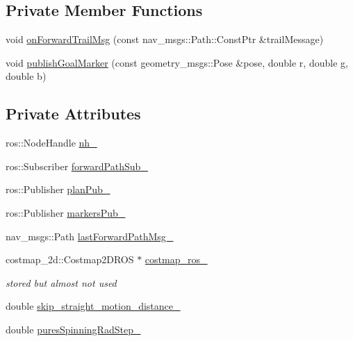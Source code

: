 \subsection*{Private Member Functions}
\begin{DoxyCompactItemize}
\item 
void \hyperlink{classcl__move__base__z_1_1backward__global__planner_1_1BackwardGlobalPlanner_a515bde5bfb3ae548f3e19209df1a48b0}{on\+Forward\+Trail\+Msg} (const nav\+\_\+msgs\+::\+Path\+::\+Const\+Ptr \&trail\+Message)
\item 
void \hyperlink{classcl__move__base__z_1_1backward__global__planner_1_1BackwardGlobalPlanner_a3c6784cad10fdadf28323380fe3d6d2b}{publish\+Goal\+Marker} (const geometry\+\_\+msgs\+::\+Pose \&pose, double r, double g, double b)
\end{DoxyCompactItemize}
\subsection*{Private Attributes}
\begin{DoxyCompactItemize}
\item 
ros\+::\+Node\+Handle \hyperlink{classcl__move__base__z_1_1backward__global__planner_1_1BackwardGlobalPlanner_adeb0df38d8dcde919b732724420a401f}{nh\+\_\+}
\item 
ros\+::\+Subscriber \hyperlink{classcl__move__base__z_1_1backward__global__planner_1_1BackwardGlobalPlanner_a27fbf960495d95b87cc50e8556c79d9f}{forward\+Path\+Sub\+\_\+}
\item 
ros\+::\+Publisher \hyperlink{classcl__move__base__z_1_1backward__global__planner_1_1BackwardGlobalPlanner_a561eab039140948c52ec928c191f3f43}{plan\+Pub\+\_\+}
\item 
ros\+::\+Publisher \hyperlink{classcl__move__base__z_1_1backward__global__planner_1_1BackwardGlobalPlanner_a6f80f7041c8cdc93e1f3dfd0e723654a}{markers\+Pub\+\_\+}
\item 
nav\+\_\+msgs\+::\+Path \hyperlink{classcl__move__base__z_1_1backward__global__planner_1_1BackwardGlobalPlanner_a149ee7d22d98271c9ee1da55241d500b}{last\+Forward\+Path\+Msg\+\_\+}
\item 
costmap\+\_\+2d\+::\+Costmap2\+D\+R\+OS $\ast$ \hyperlink{classcl__move__base__z_1_1backward__global__planner_1_1BackwardGlobalPlanner_a7103c15e6540a514acd421c3c6e194a4}{costmap\+\_\+ros\+\_\+}
\begin{DoxyCompactList}\small\item\em stored but almost not used \end{DoxyCompactList}\item 
double \hyperlink{classcl__move__base__z_1_1backward__global__planner_1_1BackwardGlobalPlanner_a045290b931b816b84ced2cfb6c39fcce}{skip\+\_\+straight\+\_\+motion\+\_\+distance\+\_\+}
\item 
double \hyperlink{classcl__move__base__z_1_1backward__global__planner_1_1BackwardGlobalPlanner_a066d160f78bebee9fc5b5251016f1cd0}{pures\+Spinning\+Rad\+Step\+\_\+}
\end{DoxyCompactItemize}



